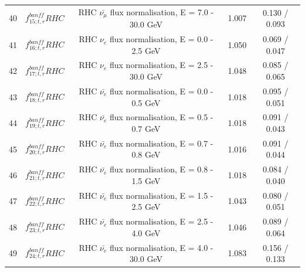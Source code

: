 \begin{tabular} { | c | c | c | c | c |  }
40 & $f_{15; t, r}^{banff} RHC$ & RHC $\bar{\nu_\mu}$ flux normalisation, E = 7.0 - 30.0 GeV & 1.007 & 0.130 / 0.093\\ 
41 & $f_{16; t, r}^{banff} RHC$ & RHC $\nu_e$ flux normalisation, E = 0.0 - 2.5 GeV & 1.050 & 0.069 / 0.047\\ 
42 & $f_{17; t, r}^{banff} RHC$ & RHC $\nu_e$ flux normalisation, E = 2.5 - 30.0 GeV & 1.048 & 0.085 / 0.065\\ 
43 & $f_{18; t, r}^{banff} RHC$ & RHC $\bar{\nu_e}$ flux normalisation, E = 0.0 - 0.5 GeV & 1.018 & 0.095 / 0.051\\ 
44 & $f_{19; t, r}^{banff} RHC$ & RHC $\bar{\nu_e}$ flux normalisation, E = 0.5 - 0.7 GeV & 1.018 & 0.091 / 0.043\\ 
45 & $f_{20; t, r}^{banff} RHC$ & RHC $\bar{\nu_e}$ flux normalisation, E = 0.7 - 0.8 GeV & 1.016 & 0.091 / 0.044\\ 
46 & $f_{21; t, r}^{banff} RHC$ & RHC $\bar{\nu_e}$ flux normalisation, E = 0.8 - 1.5 GeV & 1.018 & 0.084 / 0.040\\ 
47 & $f_{22; t, r}^{banff} RHC$ & RHC $\bar{\nu_e}$ flux normalisation, E = 1.5 - 2.5 GeV & 1.043 & 0.080 / 0.051\\ 
48 & $f_{23; t, r}^{banff} RHC$ & RHC $\bar{\nu_e}$ flux normalisation, E = 2.5 - 4.0 GeV & 1.046 & 0.089 / 0.064\\ 
49 & $f_{24; t, r}^{banff} RHC$ & RHC $\bar{\nu_e}$ flux normalisation, E = 4.0 - 30.0 GeV & 1.083 & 0.156 / 0.133\\ 

\hline

\end{tabular}